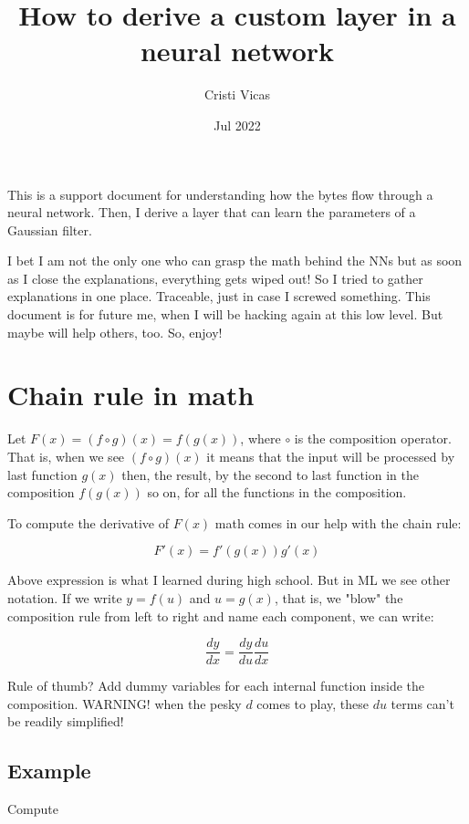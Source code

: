 \documentclass{article}
\title{How to derive a custom layer in a neural network}
\author{Cristi Vicas}
\date{Jul 2022}
\begin{document}
\maketitle

This is a support document for understanding how the bytes flow through a neural network. Then, I derive a layer that can learn the parameters of a Gaussian filter.

I bet I am not the only one who can grasp the math behind the NNs but as soon as I close the explanations, everything gets wiped out! So I tried to gather explanations in one place. Traceable, just in case I screwed something. This document is for future me, when I will be hacking again at this low level. But maybe will help others, too. So, enjoy!

\section{Chain rule in math}

Let $F(x) = (f \circ g)(x) = f(g(x))$, where $\circ$ is the composition operator. That is, when we see $(f \circ g)(x)$ it means that the input will be processed by last function $g(x)$ then, the result, by the second to last function in the composition $f(g(x))$ so on, for all the functions in the composition.

To compute the derivative of $F(x)$ math comes in our help with the chain rule:

\begin{equation}
	F'(x)=f'(g(x))g'(x)
\end{equation}

Above expression is what I learned during high school. But in ML we see other notation. If we write  $y = f(u)$ and $u = g(x)$, that is, we "blow" the composition rule from left to right and name each component, we can write:

\begin{equation}
	\frac{dy}{dx} = \frac{dy}{du}  \frac{du}{dx} \label{chain_rule}
\end{equation}

Rule of thumb? Add dummy variables for each internal function inside the composition. WARNING! when the pesky $d$ comes to play, these $du$ terms can't be readily simplified!
 
\subsection{Example}
Compute
\end{document}
